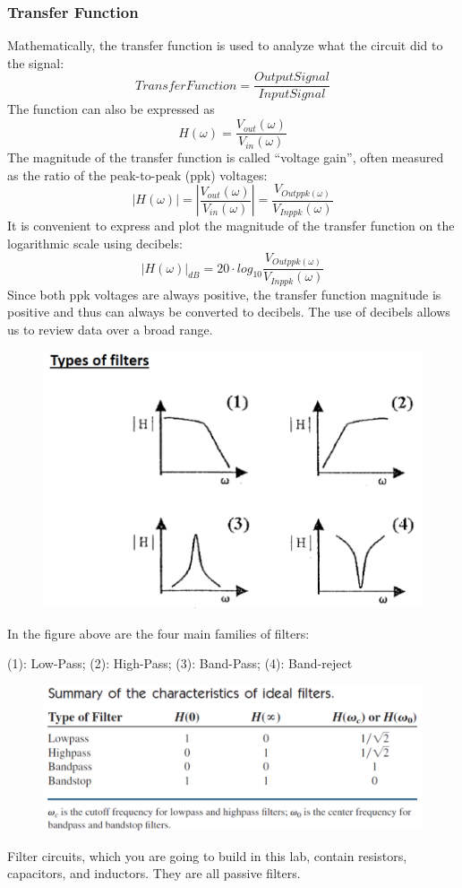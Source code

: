 \documentclass[12pt]{article}
\begin{document}
\subsubsection{Transfer Function}
Mathematically, the transfer function is used to analyze what the circuit did to the signal:
$$Transfer Function=\frac{Output Signal}{Input Signal}$$
The function can also be expressed as 
$$H(\omega)=\frac{V_{out}(\omega)}{V_{in}(\omega)}$$
The magnitude of the transfer function is called “voltage gain”, often measured as the ratio of the peak-to-peak (ppk) voltages:
$$|H(\omega)|=|\frac{V_{out}(\omega)}{V_{in}(\omega)}|=\frac{V_{Outppk(\omega)}}{V_{Inppk}(\omega)}$$
It is convenient to express and plot the magnitude of the transfer function on the logarithmic scale using decibels:
$$|H(\omega)|_{dB}=20\cdot log_{10}\frac{V_{Outppk(\omega)}}{V_{Inppk}(\omega)}$$
Since both ppk voltages are always positive, the transfer function magnitude is positive and thus can always be converted to decibels. The use of decibels allows us to review data over a broad range.
\begin{figure}[H]
\centering
\includegraphics[scale=0.5]{P1.jpg}
\end{figure}
\par In the figure above are the four main families of filters:
\par (1): Low-Pass; (2): High-Pass; (3): Band-Pass; (4): Band-reject
\begin{figure}[H]
\centering
\includegraphics[scale=0.5]{P2.jpg}
\end{figure}
Filter circuits, which you are going to build in this lab, contain resistors, capacitors, and inductors. They are all passive filters.
\end{document}
